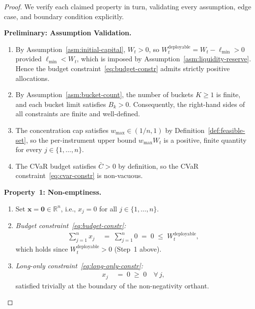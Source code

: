 \documentclass[12pt,openany]{book}
\newcommand{\bfx}{\mathbf{x}}
\numberwithin{equation}{chapter}
\theoremstyle{plain}
\theoremstyle{definition}
\theoremstyle{remark}
\numberwithin{equation}{chapter}
\theoremstyle{plain}
\begin{document}
\begin{proof}
We verify each claimed property in turn, validating every assumption,
edge case, and boundary condition explicitly.

\medskip
\noindent\textbf{Preliminary: Assumption Validation.}

\begin{enumerate}
  \item By Assumption~\ref{asm:initial-capital}, $W_t > 0$, so
        $W_t^{\mathrm{deployable}} = W_t - \ell_{\min} > 0$ provided
        $\ell_{\min} < W_t$, which is imposed by
        Assumption~\ref{asm:liquidity-reserve}.
        Hence the budget constraint~\eqref{eq:budget-constr} admits
        strictly positive allocations.

  \item By Assumption~\ref{asm:bucket-count}, the number of buckets
        $K \geq 1$ is finite, and each bucket limit satisfies
        $B_k > 0$. Consequently, the right-hand sides of all
        constraints are finite and well-defined.

  \item The concentration cap satisfies $w_{\max} \in (1/n, 1)$ by
        Definition~\ref{def:feasible-set}, so the per-instrument upper
        bound $w_{\max} W_t$ is a positive, finite quantity for
        every $j \in \{1,\ldots,n\}$.

  \item The CVaR budget satisfies $\bar{C} > 0$ by definition, so
        the CVaR constraint~\eqref{eq:cvar-constr} is non-vacuous.
\end{enumerate}

\medskip
\noindent\textbf{Property~1: Non-emptiness.}

\begin{enumerate}
  \item Set $\bfx = \mathbf{0} \in \mathbb{R}^n$, i.e.,
        $x_j = 0$ for all $j \in \{1,\ldots,n\}$.

  \item \textit{Budget constraint~\eqref{eq:budget-constr}:}
        \begin{align}
          \sum_{j=1}^n x_j
          &\;=\; \sum_{j=1}^n 0
           \;=\; 0
           \;\leq\; W_t^{\mathrm{deployable}},
        \end{align}
        which holds since $W_t^{\mathrm{deployable}} > 0$ (Step~1 above).

  \item \textit{Long-only constraint~\eqref{eq:long-only-constr}:}
        \begin{align}
          x_j &\;=\; 0 \;\geq\; 0 \quad \forall\,j,
        \end{align}
        satisfied trivially at the boundary of the non-negativity
        orthant.


\end{enumerate}
\end{proof}
\end{document}
